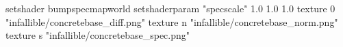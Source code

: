 setshader bumpspecmapworld
setshaderparam "specscale" 1.0 1.0 1.0
texture 0 "infallible/concretebase_diff.png"
texture n "infallible/concretebase_norm.png"
texture s "infallible/concretebase_spec.png"